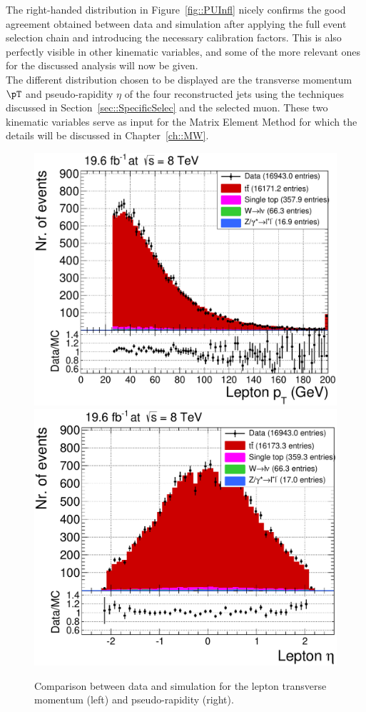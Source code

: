 The right-handed distribution in Figure~\ref{fig::PUInfl} nicely confirms the good agreement obtained between data and simulation after applying the full event selection chain and introducing the necessary calibration factors. This is also perfectly visible in other kinematic variables, and some of the more relevant ones for the discussed analysis will now be given.
\\
The different distribution chosen to be displayed are the transverse momentum $\pT$ and pseudo-rapidity $\eta$ of the four reconstructed jets using the techniques discussed in Section~\ref{sec::SpecificSelec} and the selected muon. These two kinematic variables serve as input for the Matrix Element Method for which the details will be discussed in Chapter~\ref{ch::MW}.
\begin{figure}[h!t]
 \centering
 \includegraphics[width = 0.45 \textwidth]{Chapters/Chapter4_EvtSel/Figures/LeptonPt_AllCuts_mu_Stack.pdf}
 \includegraphics[width = 0.45 \textwidth]{Chapters/Chapter4_EvtSel/Figures/LeptonEta_AllCuts_mu_Stack.pdf}
 \caption{Comparison between data and simulation for the lepton transverse momentum (left) and pseudo-rapidity (right).} \label{fig::MSPlots}
\end{figure}


